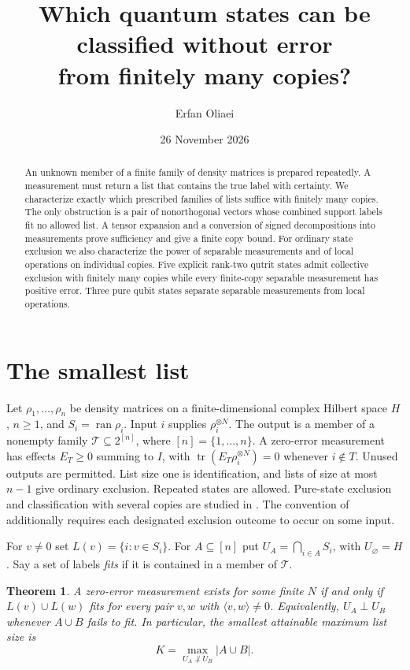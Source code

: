 \documentclass[11pt,a4paper]{article}
\title{Which quantum states can be classified without error\protect\\ from finitely many copies?}
\author{Erfan Oliaei}
\date{26 November 2026}
\newtheorem{theorem}{Theorem}
\theoremstyle{remark}
\newcommand{\tr}{\operatorname{tr}}
\newcommand{\ran}{\operatorname{ran}}
\begin{document}
\maketitle
\begin{abstract}
An unknown member of a finite family of density matrices is prepared repeatedly. A measurement must return a list that contains the true label with certainty. We characterize exactly which prescribed families of lists suffice with finitely many copies. The only obstruction is a pair of nonorthogonal vectors whose combined support labels fit no allowed list. A tensor expansion and a conversion of signed decompositions into measurements prove sufficiency and give a finite copy bound. For ordinary state exclusion we also characterize the power of separable measurements and of local operations on individual copies. Five explicit rank-two qutrit states admit collective exclusion with finitely many copies while every finite-copy separable measurement has positive error. Three pure qubit states separate separable measurements from local operations.
\end{abstract}

\section{The smallest list}

Let \(\rho_1,\ldots,\rho_n\) be density matrices on a finite-dimensional complex Hilbert space \(H\), \(n\ge1\), and \(S_i=\ran\rho_i\). Input \(i\) supplies \(\rho_i^{\otimes N}\). The output is a member of a nonempty family \(\mathcal T\subseteq 2^{[n]}\), where \([n]=\{1,\ldots,n\}\). A zero-error measurement has effects \(E_T\ge0\) summing to \(I\), with \(\tr(E_T\rho_i^{\otimes N})=0\) whenever \(i\notin T\). Unused outputs are permitted. List size one is identification, and lists of size at most \(n-1\) give ordinary exclusion. Repeated states are allowed. Pure-state exclusion and classification with several copies are studied in \cite{Roy,Johnston}. The convention of \cite{Roy} additionally requires each designated exclusion outcome to occur on some input.

For \(v\ne0\) set \(L(v)=\{i:v\in S_i\}\). For \(A\subseteq[n]\) put \(U_A=\bigcap_{i\in A} S_i\), with \(U_\varnothing=H\). Say a set of labels \emph{fits} if it is contained in a member of \(\mathcal T\).

\begin{theorem}\label{criterion}
A zero-error measurement exists for some finite \(N\) if and only if \(L(v)\cup L(w)\) fits for every pair \(v,w\) with \(\langle v,w\rangle\ne0\). Equivalently, \(U_A\perp U_B\) whenever \(A\cup B\) fails to fit. In particular, the smallest attainable maximum list size is
\[
                  K=\max_{U_A\not\perp U_B}|A\cup B|.
\]
\end{theorem}
\end{document}
